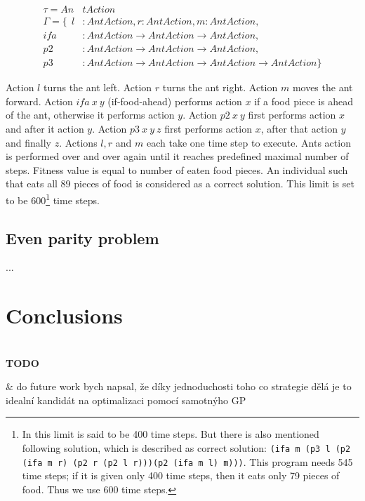 \documentclass{llncs}
\newcommand{\ar}{\rightarrow\xspace}
\newenvironment{todo}
{~\\ {\color{red}\textbf{TODO}}
  \begin{easylist}[itemize]}
{ \end{easylist}}
\begin{document}
\begin{align*}
\tau = An&tAction\\
\Gamma = \{~~
  l    &: AntAction                              ,
  r    : AntAction                               ,
  m    : AntAction                               ,\\
  ifa  &: AntAction \ar AntAction \ar AntAction  ,\\
  p2   &: AntAction \ar AntAction \ar AntAction  ,\\
  p3   &: AntAction \ar AntAction \ar AntAction \ar AntAction  \}
\end{align*}

Action $l$ turns the ant left. 
Action $r$ turns the ant right.
Action $m$ moves the ant forward.
Action $ifa~x~y$ (if-food-ahead) performs action $x$ 
if a food piece is ahead of the ant,
otherwise it performs action $y$.
Action $p2~x~y$ first performs action $x$ and after it action $y$.
Action $p3~x~y~z$ first performs action $x$, 
after that action $y$ and finally $z$.
Actions $l, r$ and $m$ each take one time step to execute.
Ants action is performed over and over again until it reaches predefined
maximal number of steps. 
Fitness value is equal to number of eaten food pieces.
An individual such that eats all 89 pieces of food is 
considered as a correct solution.
This limit is set to be 600\footnote{
In \cite{koza92} this limit is said to be 400 time steps.
But there is also mentioned following solution, 
which is described as correct solution:
\texttt{(ifa m (p3 l (p2 (ifa m r) (p2 r (p2 l r)))(p2 (ifa m l) m)))}.
This program needs 545
time steps; if it is given only 400 time steps, then it eats only 79 pieces
of food. Thus we use 600 time steps. 
} time steps.




\subsection{Even parity problem}
...


\section{Conclusions}
\label{conclusions}

\begin{todo}
 & do future work bych napsal, že díky jednoduchosti 
   toho co strategie dělá je to idealní kandidát na 
   optimalizaci pomocí samotnýho GP
\end{todo}

\nocite{*}



\end{document}
